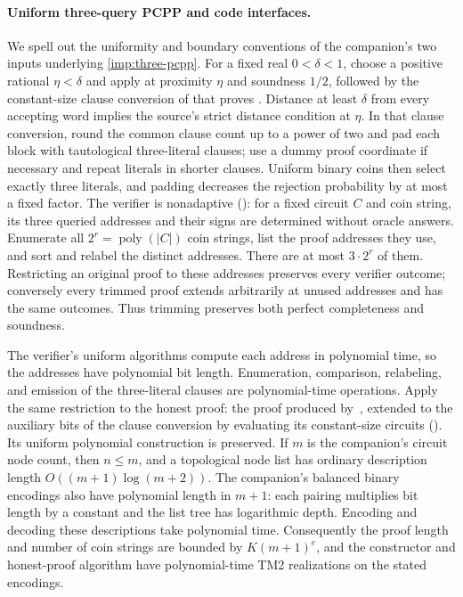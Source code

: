 \documentclass[11pt,letterpaper]{article}
\theoremstyle{definition}
\theoremstyle{remark}
\newcommand{\poly}{\operatorname{poly}}
\begin{document}
\paragraph{Uniform three-query PCPP and code interfaces.}
We spell out the uniformity and boundary conventions of the
companion's two inputs underlying \cref{imp:three-pcpp}.
For a fixed real \(0<\delta<1\), choose a positive rational
\(\eta<\delta\) and apply \cite[Lemma~22]{CW19} at proximity
\(\eta\) and soundness \(1/2\), followed by the constant-size clause
conversion of \cite[Appendix~A]{CW19} that proves
\cite[Lemma~24]{CW19}. Distance at least \(\delta\) from every
accepting word implies the source's strict distance condition at
\(\eta\). In that clause conversion,
round the common clause count up to a power of two and pad each
block with tautological three-literal clauses; use a dummy proof
coordinate if necessary and repeat literals in shorter clauses.
Uniform binary coins then select exactly three literals, and
padding decreases the rejection probability by at most a fixed
factor. The verifier is nonadaptive
(\cite[Definition~20]{CW19}):
for a fixed circuit \(C\) and coin string, its three queried
addresses and their signs are determined without oracle answers.
Enumerate all \(2^r=\poly(|C|)\) coin strings, list the proof
addresses they use, and sort and relabel the distinct addresses.
There are at most \(3\cdot2^r\) of them. Restricting an original
proof to these addresses preserves every verifier outcome;
conversely every trimmed proof extends arbitrarily at unused
addresses and has the same outcomes. Thus trimming preserves
both perfect completeness and soundness.

The verifier's uniform algorithms compute each address in
polynomial time, so the addresses have polynomial bit length.
Enumeration, comparison, relabeling, and emission of the
three-literal clauses are polynomial-time operations. Apply the
same restriction to the honest proof: the proof produced
by~\cite[Lemma~22]{CW19}, extended to the auxiliary bits of the
clause conversion by evaluating its constant-size circuits
(\cite[Appendix~A]{CW19}). Its uniform polynomial construction is
preserved. If \(m\) is the companion's circuit
node count, then \(n\le m\), and a topological node list has
ordinary description length \(O((m+1)\log(m+2))\).
The companion's balanced binary encodings also have polynomial
length in \(m+1\): each pairing multiplies bit length by a
constant and the list tree has logarithmic depth. Encoding and
decoding these descriptions take polynomial time. Consequently
the proof length and number of coin strings are bounded by
\(K(m+1)^e\), and the constructor and honest-proof algorithm
have polynomial-time TM2 realizations on the stated encodings.
\end{document}
